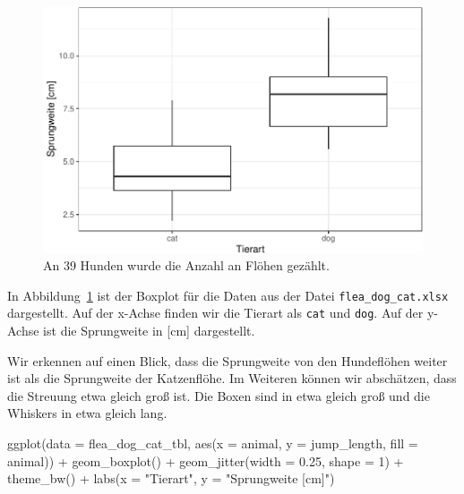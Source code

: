\documentclass[
  letterpaper,
  DIV=11,
  oneside]{scrreport}
\newenvironment{Shaded}{\begin{snugshade}}{\end{snugshade}}
\newcommand{\AttributeTok}[1]{\textcolor[rgb]{0.40,0.45,0.13}{#1}}
\newcommand{\DecValTok}[1]{\textcolor[rgb]{0.68,0.00,0.00}{#1}}
\newcommand{\FloatTok}[1]{\textcolor[rgb]{0.68,0.00,0.00}{#1}}
\newcommand{\FunctionTok}[1]{\textcolor[rgb]{0.28,0.35,0.67}{#1}}
\newcommand{\NormalTok}[1]{\textcolor[rgb]{0.00,0.23,0.31}{#1}}
\newcommand{\SpecialCharTok}[1]{\textcolor[rgb]{0.37,0.37,0.37}{#1}}
\newcommand{\StringTok}[1]{\textcolor[rgb]{0.13,0.47,0.30}{#1}}
\begin{document}
\begin{figure}

{\centering \includegraphics{./eda-ggplot_files/figure-pdf/fig-boxplot-flea-0-1.pdf}

}

\caption{\label{fig-boxplot-flea-0}An 39 Hunden wurde die Anzahl an
Flöhen gezählt.}

\end{figure}

In Abbildung~\ref{fig-boxplot-flea-0} ist der Boxplot für die Daten aus
der Datei \texttt{flea\_dog\_cat.xlsx} dargestellt. Auf der x-Achse
finden wir die Tierart als \texttt{cat} und \texttt{dog}. Auf der
y-Achse ist die Sprungweite in {[}cm{]} dargestellt.

Wir erkennen auf einen Blick, dass die Sprungweite von den Hundeflöhen
weiter ist als die Sprungweite der Katzenflöhe. Im Weiteren können wir
abschätzen, dass die Streuung etwa gleich groß ist. Die Boxen sind in
etwa gleich groß und die Whiskers in etwa gleich lang.

\begin{Shaded}
\begin{Highlighting}[]
\FunctionTok{ggplot}\NormalTok{(}\AttributeTok{data =}\NormalTok{ flea\_dog\_cat\_tbl, }\FunctionTok{aes}\NormalTok{(}\AttributeTok{x =}\NormalTok{ animal, }\AttributeTok{y =}\NormalTok{ jump\_length,}
                                    \AttributeTok{fill =}\NormalTok{ animal)) }\SpecialCharTok{+}
  \FunctionTok{geom\_boxplot}\NormalTok{() }\SpecialCharTok{+}
  \FunctionTok{geom\_jitter}\NormalTok{(}\AttributeTok{width =} \FloatTok{0.25}\NormalTok{, }\AttributeTok{shape =} \DecValTok{1}\NormalTok{) }\SpecialCharTok{+}
  \FunctionTok{theme\_bw}\NormalTok{() }\SpecialCharTok{+}
  \FunctionTok{labs}\NormalTok{(}\AttributeTok{x =} \StringTok{"Tierart"}\NormalTok{, }\AttributeTok{y =} \StringTok{"Sprungweite [cm]"}\NormalTok{) }
\end{Highlighting}
\end{Shaded}
\end{document}
